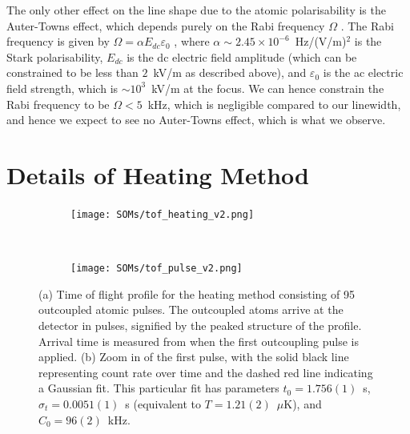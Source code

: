 \documentclass[%
 amsmath,amssymb,
aps,
]{revtex4-2}
\begin{document}
The only other effect on the line shape due to the atomic polarisability is the Auter-Towns effect, which depends purely on the Rabi frequency \(\Omega\) \cite{PhysRevA.73.043416,CohenTannoudji1996}. The Rabi frequency is given by \(\Omega=\alpha E_{dc} \varepsilon_0\) \cite{PhysRevA.73.043416}, where \(\alpha\sim 2.45 \times 10^{-6}\)~Hz/(V/m)\(^2\) is the Stark polarisability, \(E_{dc}\) is the dc electric field amplitude (which can be constrained to be less than \(2\)~kV/m as described above), and \(\varepsilon_0\) is the ac electric field strength, which is \(\sim10^3\)~kV/m at the focus. We can hence constrain the Rabi frequency to be \(\Omega < 5\)~kHz, which is negligible compared to our linewidth, and hence we expect to see no Auter-Towns effect, which is what we observe.

\section{Details of Heating Method}

\begin{figure}[t]
    \centering
    \begin{subfigure}[t]{.5\textwidth}
        \centering
        \caption{}
        \texttt{[image: SOMs/tof\_heating\_v2.png]}
        \label{fig:tof}
    \end{subfigure}%
    ~ ~ ~ ~ ~ ~ ~
    \begin{subfigure}[t]{.5\textwidth}
        \centering
        \caption{}
        \texttt{[image: SOMs/tof\_pulse\_v2.png]}
        \label{fig:pulse}
    \end{subfigure}
    \caption{(a) Time of flight profile for the heating method consisting of 95 outcoupled atomic pulses. The outcoupled atoms arrive at the detector in pulses, signified by the peaked structure of the profile. Arrival time is measured from when the first outcoupling pulse is applied. (b) Zoom in of the first pulse, with the solid black line representing count rate over time and the dashed red line indicating a Gaussian fit. This particular fit has parameters \(t_0=1.756(1)\)~s, \(\sigma_t = 0.0051(1)\)~s (equivalent to \(T=1.21(2)\)~\(\mu\)K), and \(C_0 = 96(2)\)~kHz.}
\end{figure}

\end{document}
